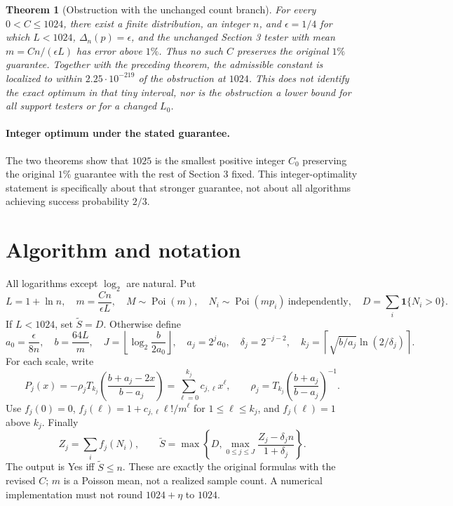 \documentclass[11pt]{article}
\newtheorem{theorem}{Theorem}
\newcommand{\Poi}{\operatorname{Poi}}
\begin{document}
\begin{theorem}[Obstruction with the unchanged count branch]
For every $0<C\le1024$, there exist a finite distribution, an integer $n$,
and $\epsilon=1/4$ for which $L<1024$, $\Delta_n(p)=\epsilon$, and the
unchanged Section 3 tester with mean $m=Cn/(\epsilon L)$ has error above
$1\%$. Thus no such $C$ preserves the original $1\%$ guarantee.
Together with the preceding theorem, the admissible constant is localized
to within $2.25\cdot10^{-219}$ of the obstruction at $1024$.
This does not identify the exact optimum in that tiny interval, nor is the
obstruction a lower bound for all support testers or for a changed $L_0$.
\end{theorem}

\paragraph{Integer optimum under the stated guarantee.}
The two theorems show that $1025$ is the smallest positive integer $C_0$
preserving the original $1\%$ guarantee with the rest of Section 3 fixed.
This integer-optimality statement is specifically about that stronger
guarantee, not about all algorithms achieving success probability $2/3$.

\section{Algorithm and notation}
All logarithms except $\log_2$ are natural. Put
\[
 L=1+\ln n,\quad m=\frac{Cn}{\epsilon L},\quad
 M\sim\Poi(m),\quad N_i\sim\Poi(mp_i)\ \text{independently},\quad
 D=\sum_i\mathbf1\{N_i>0\}.
\]
If $L<1024$, set $\widetilde S=D$. Otherwise define
\[
 a_0=\frac{\epsilon}{8n},\quad b=\frac{64L}{m},\quad
 J=\left\lfloor\log_2\frac b{2a_0}\right\rfloor,\quad
 a_j=2^ja_0,\quad \delta_j=2^{-j-2},\quad
 k_j=\left\lceil\sqrt{b/a_j}\ln(2/\delta_j)\right\rceil.
\]
For each scale, write
\[
 P_j(x)=-\rho_jT_{k_j}\!\left(\frac{b+a_j-2x}{b-a_j}\right)
       =\sum_{\ell=0}^{k_j}c_{j,\ell}x^\ell,\qquad
 \rho_j=T_{k_j}\!\left(\frac{b+a_j}{b-a_j}\right)^{-1}.
\]
Use $f_j(0)=0$, $f_j(\ell)=1+c_{j,\ell}\ell!/m^\ell$ for
$1\le\ell\le k_j$, and $f_j(\ell)=1$ above $k_j$. Finally
\[
 Z_j=\sum_i f_j(N_i),\qquad
 \widetilde S=\max\left\{D,\max_{0\le j\le J}\frac{Z_j-\delta_jn}{1+\delta_j}\right\}.
\]
The output is Yes iff $\widetilde S\le n$. These are exactly the original
formulas with the revised $C$; $m$ is a Poisson mean, not a realized sample
count. A numerical implementation must not round $1024+\eta$ to $1024$.
\end{document}
